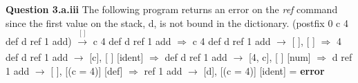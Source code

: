 \documentclass[12pt]{report}
\begin{document}
{\bf Question 3.a.iii} \newline
The following program returns an error on the {\em ref} command since the first value on the stack, d, is not bound in the dictionary. \newline
(postfix 0 c 4 def d ref 1 add) $\xrightarrow[ ]{\text{[ ]}}$ c 4 def d ref 1 add \newline
$\Rightarrow$ c 4 def d ref 1 add $\rightarrow$ [ ], [ ] \newline
$\Rightarrow$ 4 def d ref 1 add $\rightarrow$ [c], [ ] \hfil [ident] \newline
$\Rightarrow$ def d ref 1 add $\rightarrow$ [4, c], [ ] \hfil [num] \newline
$\Rightarrow$ d ref 1 add $\rightarrow$ [ ], [(c = 4)] \hfil [def] \newline
$\Rightarrow$ ref 1 add $\rightarrow$ [d], [(c = 4)] \hfil [ident] \newline
= {\bf error} \newline
\end{document}
